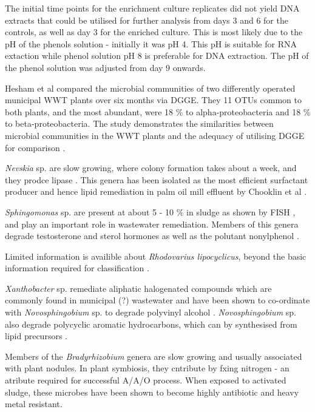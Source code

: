 \documentclass[11pt]{article}
\begin{document}
The initial time points for the enrichment culture replicates did not yield DNA extracts that could be utilised for further analysis from days 3 and 6 for the controls, as well as day 3 for the enriched culture. This is most likely due to the pH of the phenols solution - initially it was pH 4. This pH is suitable for RNA extaction while phenol solution pH 8 is preferable for DNA extraction. The pH of the phenol solution was adjusted from day 9 onwards.

Hesham et al compared the microbial communities of two differently operated municipal WWT plants over six months via DGGE. They 11 OTUs common to both plants, and the most abundant, were 18 \% to alpha-proteobacteria and 18 \% to beta-proteobacteria. The study demonstrates the similarities between microbial communities in the WWT plants and the adequacy of utilising DGGE for comparison \cite{Hesham_11}.


\emph{Nevskia} sp. are slow growing, where colony formation takes about a week, and they prodce lipase \cite{kim2011nevskia}. This genera has been isolated as the most efficient surfactant producer and hence lipid remediation in palm oil mill effluent by Chooklin et al \cite{hooklinutilization}.

\emph{Sphingomonas} sp. are present at about 5 - 10 \% in sludge as shown by FISH \cite{neef1999detection}, and play an important role in wastewater remediation. Members of this genera degrade testosterone and sterol hormones as well as the polutant nonylphenol \cite{fujii2001sphingomonas,roh201017beta}.

Limited information is availible about \emph{Rhodovarius lipocyclicus}, beyond the basic information required for classification \cite{kampfer2004rhodovarius}.

\emph{Xanthobacter} sp. remediate aliphatic halogenated compounds which are commonly found in municipal (?) wastewater \cite{janssen1985degradation} and have been shown to co-ordinate with \emph{Novosphingobium} sp. to degrade polyvinyl alcohol \cite{rong2009symbiotic}. \emph{Novosphingobium} sp. also degrade polycyclic aromatic hydrocarbons, which can by synthesised from lipid precursors \cite{addison2007novosphingobium}.

Members of the \emph{Bradyrhizobium} genera are slow growing \cite{rebah2002wastewater} and usually associated with plant nodules. In plant symbiosis, they cntribute by fxing nitrogen - an atribute required for successful A/A/O process. When exposed to activated sludge, these microbes have been shown to become highly antibiotic and heavy metal resistant.
\end{document}

